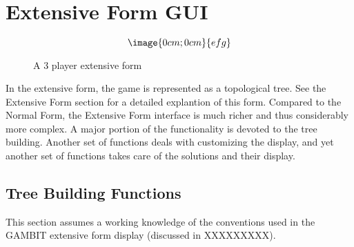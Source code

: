 \section{Extensive Form GUI}

\begin{figure}
$$\image{0cm;0cm}{efg}$$
\caption{A 3 player extensive form}\label{fig:efg}
\end{figure}

In the extensive form, the game is represented as a topological tree.  See
the Extensive Form section for a detailed explantion of this form.
Compared to the Normal Form, the Extensive Form interface is much richer
and thus considerably more complex.  A major portion of the functionality
is devoted to the tree building.  Another set of functions deals with
customizing the display, and yet another set of functions takes care of
the solutions and their display.

\subsection{Tree Building Functions}
This section assumes a working knowledge of the conventions used in the
GAMBIT extensive form display (discussed in XXXXXXXXX).

